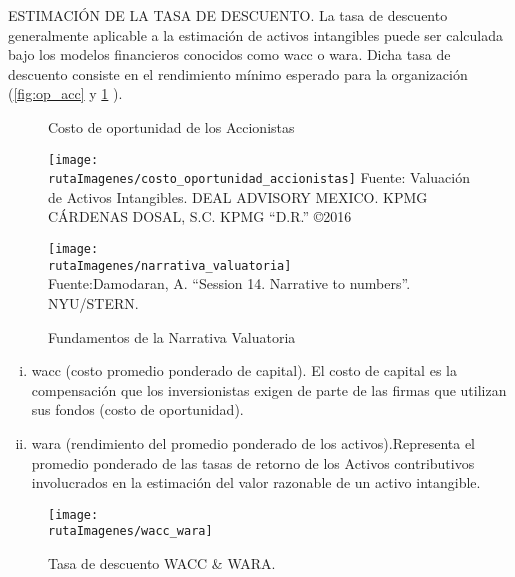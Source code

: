 \textcolor{secundario}{ESTIMACI\'ON DE LA TASA DE DESCUENTO}. La tasa de descuento generalmente aplicable a la estimaci\'on de activos intangibles puede ser calculada bajo los modelos financieros conocidos como  \gls{wacc} o \gls{wara}. Dicha tasa de descuento consiste en el rendimiento m\'inimo esperado para la organizaci\'on (\autoref{fig:op_acc} y \ref{fig:narr_val} ).

\begin{figure}[H]
\centering
\begin{minipage}{8cm}
\caption{Costo de oportunidad de los Accionistas\label{fig:op_acc}}
\texttt{[image: \\rutaImagenes/costo\_oportunidad\_accionistas]}
\footnotesize{Fuente: Valuaci\'on de Activos Intangibles. DEAL ADVISORY MEXICO. KPMG C\'ARDENAS DOSAL, S.C. KPMG ``D.R.'' \copyright 2016}
\end{minipage}
\quad
\begin{minipage}{8cm}
\caption{Fundamentos de la Narrativa Valuatoria\label{fig:narr_val}}
\texttt{[image: \\rutaImagenes/narrativa\_valuatoria]}\\
\footnotesize{Fuente:Damodaran, A. ``Session 14. Narrative to numbers''. NYU/STERN.}

\end{minipage}

\end{figure}

\begin{enumerate}[i)]
\item \textcolor{secundario}{\gls{wacc} (costo promedio ponderado de capital).} El costo de capital es la compensaci\'on que los inversionistas exigen de parte de las firmas que utilizan sus fondos (costo de oportunidad).
\item \textcolor{secundario}{\gls{wara} (rendimiento del promedio ponderado de los activos).}Representa el promedio ponderado de las tasas de retorno de los Activos contributivos involucrados en la estimaci\'on del  valor razonable de un activo intangible.
\end{enumerate}

\begin{figure}[H]
\centering
\caption{Tasa de descuento WACC \& WARA.\label{fig:wacc_wara}}
\texttt{[image: \\rutaImagenes/wacc\_wara]}
\end{figure}